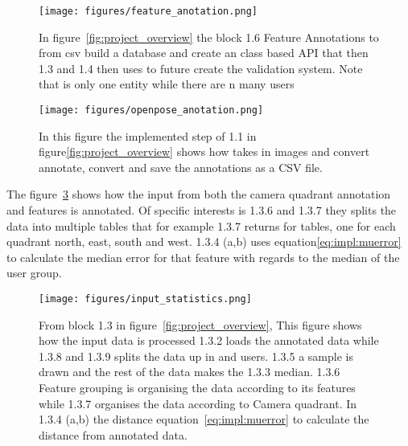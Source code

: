 \begin{figure}[ht]
\begin{center}
    \texttt{[image: figures/feature\_anotation.png]}
\end{center}
\caption{In figure~\ref{fig:project_overview} the block 1.6 Feature Annotations to from \ac{csv} build a database and create an class based API that then 1.3 and 1.4 then uses to future create the validation system. Note that \openpos is only one entity while there are n many users}
\label{fig:1.6.feoture_antotation}
\end{figure}



\begin{figure}[ht]
\begin{center}
    \texttt{[image: figures/openpose\_anotation.png]}
\end{center}
\caption{In this figure the implemented step of 1.1 in figure\ref{fig:project_overview} shows how \openpose takes in images and convert annotate, convert and save the annotations as a CSV file.}
\label{fig:1.1.openpose_anotation}
\end{figure}

The figure~\ref{fig:1.3_input_statistics} shows how the input from both the camera quadrant annotation and features is annotated.
Of specific interests is 1.3.6 and 1.3.7 they splits the data into multiple tables that for example 1.3.7 returns for tables, one for each quadrant north, east, south and west.
1.3.4 (a,b) uses equation\ref{eq:impl:muerror} to calculate the median error for that feature with regards to the median of the user group.



\begin{figure}
\begin{center}
    \texttt{[image: figures/input\_statistics.png]}
\end{center}
\caption{From block 1.3 in figure~\ref{fig:project_overview}, This figure shows how the input data is processed 1.3.2 loads the annotated data while 1.3.8 and 1.3.9 splits the data up in \openpose and users. 1.3.5 a sample is drawn and the rest of the data makes the 1.3.3 median. 1.3.6 Feature grouping is organising the data according to its features while 1.3.7 organises the data according to Camera quadrant. In 1.3.4 (a,b) the distance equation~\ref{eq:impl:muerror} to calculate the distance from annotated data.}
\label{fig:1.3_input_statistics}
\end{figure}


